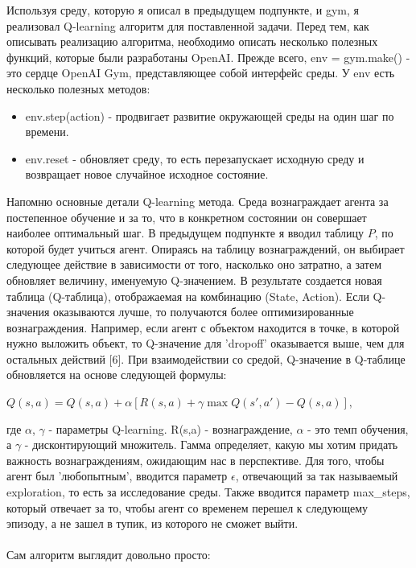 \documentclass[a4paper]{report}
\theoremstyle{definition}
\theoremstyle{plain}
\theoremstyle{remark}
\theoremstyle{remark}
\theoremstyle{definition}
\begin{document}
Используя среду, которую я описал в предыдущем подпункте, и gym, я реализовал Q-learning алгоритм для поставленной задачи. Перед тем, как описывать реализацию алгоритма, необходимо описать несколько полезных функций, которые были разработаны OpenAI. Прежде всего, env = gym.make() - это сердце OpenAI Gym, представляющее собой интерфейс среды. У env есть несколько полезных методов:
\begin{itemize}
    \item env.step(action) - продвигает развитие окружающей среды на один шаг по времени.
    \item env.reset - обновляет среду, то есть перезапускает исходную среду и возвращает новое случайное исходное состояние.
\end{itemize}
Напомню основные детали Q-learning метода. Среда вознаграждает агента за постепенное обучение и за то, что в конкретном состоянии он совершает наиболее оптимальный шаг. В предыдущем подпункте я вводил таблицу $P$, по которой будет учиться агент. Опираясь на таблицу вознаграждений, он выбирает следующее действие в зависимости от того, насколько оно затратно, а затем обновляет величину, именуемую Q-значением. В результате создается новая таблица (Q-таблица), отображаемая на комбинацию (State, Action). Если Q-значения оказываются лучше, то получаются более оптимизированные вознаграждения. Например, если агент с объектом находится в точке, в которой нужно выложить объект, то Q-значение для 'dropoff' оказывается выше, чем для остальных действий [6]. При взаимодействии со средой, Q-значение в Q-таблице обновляется на основе следующей формулы:
\begin{center}
    $
    Q(s,a) = Q(s,a) + \alpha[R(s,a) + \gamma \max Q(s',a') - Q(s,a)],
    $
\end{center}
где $\alpha$, $\gamma$ - параметры Q-learning. R(s,a) - вознаграждение, $\alpha$ - это темп обучения, а $\gamma$ - дисконтирующий множитель. Гамма определяет, какую мы хотим придать важность вознаграждениям, ожидающим нас в перспективе. Для того, чтобы агент был 'любопытным', вводится параметр $\epsilon$, отвечающий за так называемый exploration, то есть за исследование среды. Также вводится параметр max\_steps, который отвечает за то, чтобы агент со временем перешел к следующему эпизоду, а не зашел в тупик, из которого не сможет выйти.\\
\\
Сам алгоритм выглядит довольно просто:
\end{document}
